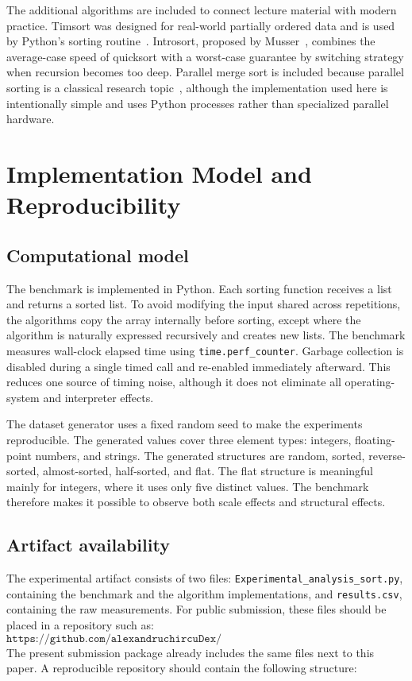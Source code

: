\documentclass[11pt,a4paper]{article}
\begin{document}
The additional algorithms are included to connect lecture material with modern practice. Timsort was designed for real-world partially ordered data and is used by Python's sorting routine~\cite{peters2002}. Introsort, proposed by Musser~\cite{musser1997}, combines the average-case speed of quicksort with a worst-case guarantee by switching strategy when recursion becomes too deep. Parallel merge sort is included because parallel sorting is a classical research topic~\cite{hirschberg1978}, although the implementation used here is intentionally simple and uses Python processes rather than specialized parallel hardware.

\section{Implementation Model and Reproducibility}\label{sec:implementation}

\subsection{Computational model}

The benchmark is implemented in Python. Each sorting function receives a list and returns a sorted list. To avoid modifying the input shared across repetitions, the algorithms copy the array internally before sorting, except where the algorithm is naturally expressed recursively and creates new lists. The benchmark measures wall-clock elapsed time using \texttt{time.perf\_counter}. Garbage collection is disabled during a single timed call and re-enabled immediately afterward. This reduces one source of timing noise, although it does not eliminate all operating-system and interpreter effects.

The dataset generator uses a fixed random seed to make the experiments reproducible. The generated values cover three element types: integers, floating-point numbers, and strings. The generated structures are random, sorted, reverse-sorted, almost-sorted, half-sorted, and flat. The flat structure is meaningful mainly for integers, where it uses only five distinct values. The benchmark therefore makes it possible to observe both scale effects and structural effects.

\subsection{Artifact availability}

The experimental artifact consists of two files: \texttt{Experimental\_analysis\_sort.py}, containing the benchmark and the algorithm implementations, and \texttt{results.csv}, containing the raw measurements. For public submission, these files should be placed in a repository such as:
\[
\texttt{https://github.com/alexandruchircuDex/Experimental\_sorting\_algorithms\_example}
\]
The present submission package already includes the same files next to this paper. A reproducible repository should contain the following structure:
\end{document}
